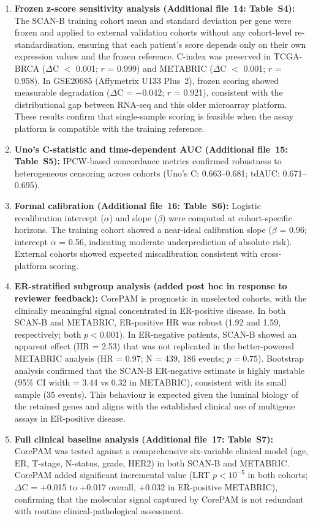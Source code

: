 \documentclass[11pt]{article}
\begin{document}
\begin{enumerate}
  \item \textbf{Frozen z-score sensitivity analysis (Additional file~14: Table~S4):} The SCAN-B training cohort mean and standard deviation per gene were frozen and applied to external validation cohorts without any cohort-level re-standardisation, ensuring that each patient's score depends only on their own expression values and the frozen reference. C-index was preserved in TCGA-BRCA ($\Delta$C $<$ 0.001; $r$ = 0.999) and METABRIC ($\Delta$C $<$ 0.001; $r$ = 0.958). In GSE20685 (Affymetrix U133 Plus~2), frozen scoring showed measurable degradation ($\Delta$C = $-$0.042; $r$ = 0.921), consistent with the distributional gap between RNA-seq and this older microarray platform. These results confirm that single-sample scoring is feasible when the assay platform is compatible with the training reference.

  \item \textbf{Uno's C-statistic and time-dependent AUC (Additional file~15: Table~S5):} IPCW-based concordance metrics confirmed robustness to heterogeneous censoring across cohorts (Uno's C: 0.663--0.681; tdAUC: 0.671--0.695).

  \item \textbf{Formal calibration (Additional file~16: Table~S6):} Logistic recalibration intercept ($\alpha$) and slope ($\beta$) were computed at cohort-specific horizons. The training cohort showed a near-ideal calibration slope ($\beta$ = 0.96; intercept $\alpha$ = 0.56, indicating moderate underprediction of absolute risk). External cohorts showed expected miscalibration consistent with cross-platform scoring.

  \item \textbf{ER-stratified subgroup analysis (added post hoc in response to reviewer feedback):} CorePAM is prognostic in unselected cohorts, with the clinically meaningful signal concentrated in ER-positive disease. In both SCAN-B and METABRIC, ER-positive HR was robust (1.92 and 1.59, respectively; both $p < 0.001$). In ER-negative patients, SCAN-B showed an apparent effect (HR = 2.53) that was not replicated in the better-powered METABRIC analysis (HR = 0.97; N = 439, 186 events; $p = 0.75$). Bootstrap analysis confirmed that the SCAN-B ER-negative estimate is highly unstable (95\% CI width = 3.44 vs 0.32 in METABRIC), consistent with its small sample (35 events). This behaviour is expected given the luminal biology of the retained genes and aligns with the established clinical use of multigene assays in ER-positive disease.

  \item \textbf{Full clinical baseline analysis (Additional file~17: Table~S7):} CorePAM was tested against a comprehensive six-variable clinical model (age, ER, T-stage, N-status, grade, HER2) in both SCAN-B and METABRIC. CorePAM added significant incremental value (LRT $p < 10^{-5}$ in both cohorts; $\Delta$C = +0.015 to +0.017 overall, +0.032 in ER-positive METABRIC), confirming that the molecular signal captured by CorePAM is not redundant with routine clinical-pathological assessment.
\end{enumerate}
\end{document}
